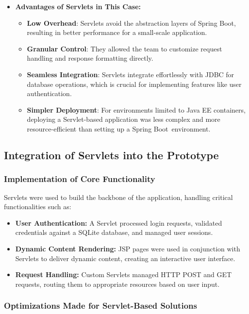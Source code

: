 \begin{itemize}
    \item \textbf{Advantages of Servlets in This Case:} 
    \begin{itemize}
    \item \textbf{Low Overhead}: Servlets avoid the abstraction layers of Spring Boot, resulting in better performance for a small-scale application.
    \item \textbf{Granular Control}: They allowed the team to customize request handling and response formatting directly.
    \item \textbf{Seamless Integration}: Servlets integrate effortlessly with JDBC for database operations, which is crucial for implementing features like user authentication.
    \item \textbf{Simpler Deployment}: For environments limited to Java EE containers, deploying a Servlet-based application was less complex and more resource-efficient than setting up a Spring Boot environment.

  
\end{itemize}
\end{itemize}
\subsection{Integration of Servlets into the Prototype}

\subsubsection{Implementation of Core Functionality}

Servlets were used to build the backbone of the application, handling critical functionalities such as:

\begin{itemize}
    \item \textbf{User Authentication:} A Servlet processed login requests, validated credentials against a SQLite database, and managed user sessions.
    \item \textbf{Dynamic Content Rendering:} JSP pages were used in conjunction with Servlets to deliver dynamic content, creating an interactive user interface.
    \item \textbf{Request Handling:} Custom Servlets managed HTTP POST and GET requests, routing them to appropriate resources based on user input.
\end{itemize}

\subsubsection{Optimizations Made for Servlet-Based Solutions}

